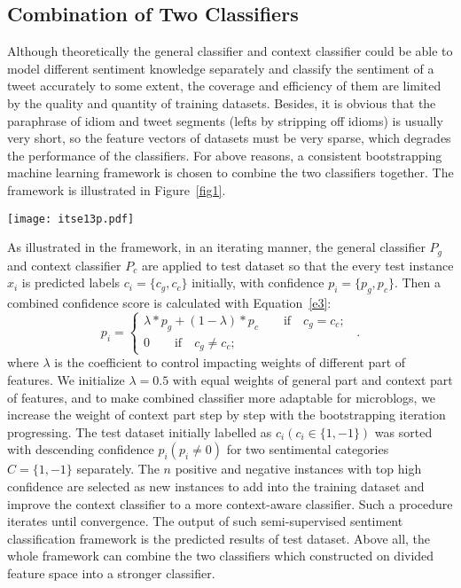 \begin{definition}[假设]
\subsection{Combination of Two Classifiers}
\label{combination}

Although theoretically the general classifier and context classifier could be able to model different sentiment knowledge separately and classify the sentiment of a tweet accurately to some extent, the coverage and efficiency of them are limited by the quality and quantity of training datasets. 
Besides, it is obvious that the paraphrase of idiom and tweet segments (lefts by stripping off idioms) is usually very short, so the feature vectors of datasets must be very sparse, which degrades the performance of the classifiers. 
For above reasons, a consistent bootstrapping machine learning framework is chosen to combine the two classifiers together. 
The framework is illustrated in Figure~\ref{fig1}. 
\begin{figure*}[!t] 
\centering%
\texttt{[image: itse13p.pdf]}
\caption{The Bootstrapping Sentiment classification Framework}
\label{fig1}
\end{figure*}
As illustrated in the framework, in an iterating manner, the general classifier $ P_{g} $ and context classifier $ P_{c} $ are applied to test dataset so that the every test instance $ x_{i} $ is predicted labels $ c_{i}=\lbrace c_{g},c_{c}\rbrace $ initially, with confidence $ p_{i}= \lbrace p_{g},p_{c}\rbrace$. 
Then a combined confidence score is calculated with Equation~\ref{e3}:
\begin{equation}
\label{e3}
p_{i}=\left\{
\begin{array}{rcl}
\lambda\ast p_{g} + \left( 1-\lambda \right) \ast p_{c} \qquad \mbox{if} \quad c_{g}=c_{c};\\
0 \qquad \mbox{if} \quad c_{g} \neq c_{c};
\end{array}
\right. \enspace .
\end{equation}
where $ \lambda $ is the coefficient to control impacting weights of different part of features. 
We initialize $ \lambda = 0.5 $ with equal weights of general part and context part of features, and to make combined classifier more adaptable for microblogs, we  increase the weight of context part step by step with the bootstrapping iteration progressing.
The test dataset initially labelled as $ c_{i} \left( c_{i} \in \lbrace 1, -1\rbrace \right)$ was sorted with descending confidence $ p_{i} \left( p_{i} \neq 0 \right) $ for two sentimental categories $ C=\lbrace 1,-1\rbrace $ separately.
The $ n $  positive and negative instances with top high confidence are selected as new instances to add into the training dataset and improve the context classifier to a more context-aware classifier. 
Such a procedure iterates until convergence.
The output of such semi-supervised sentiment classification framework is the predicted results of test dataset. 
Above all, the whole framework can combine the two classifiers which constructed on divided feature space into a stronger classifier. 


\end{definition}
